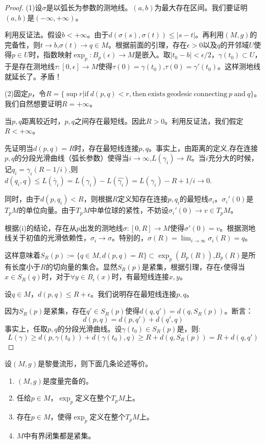     \begin{proof}
        (1)设$\sigma$是以弧长为参数的测地线。$(a,b)$为最大存在区间。我们要证明$(a,b)$是$(-\infty,+\infty)$。

        利用反证法。假设$b<+\infty$。由于$d(\sigma(s),\sigma(t))\leq |s-t|$。再利用$(M,g)$的完备性，则$t \to b$,$\sigma(t) \to q \in M$。根据前面的引理，存在$\epsilon>0$以及$q$的开邻域$U$使得$ p\in U$时，指数映射$\exp_p:B_p(\epsilon)\to M$是嵌入。取$|t_0 -b|<\epsilon/2$，$\gamma(t_0)\subset U$，于是存在测地线$\tau:[0,\epsilon] \to M$使得$\tau(0)=\gamma(t_0)$,$\tau(0)=\gamma'(t_0)$。这样测地线就延长了。矛盾！

        (2)固定$p$，令$R=\{\sup r| \mathrm{if}\ d(p,q)<r, \mathrm{then\ exists\ geodesic\ connecting}\ p\ \mathrm{and}\ q\}$。我们自然想要证明$R=+\infty$。

        当$p,q$距离较近时，$p,q$之间存在最短线。因此$R>0$。利用反证法，我们假定$R<+\infty$。

        先证明当$d(p,q)=R$时，存在最短线连接$p,q$。事实上，由距离的定义,存在连接$p,q$的分段光滑曲线（弧长参数）使得当$i \to \infty$,$L(\gamma_i) \to R$。当$i$充分大的时候，记$q_i=\gamma_i(R-1/i)$,则$d(q_i,q)\leq L(\check{\gamma_i})=L(\gamma_i)-L(\hat{\gamma_i})=L(\gamma_i)-R+1/i \to 0$.

        同时，由于$d(p,q_i)<R$，则根据$R$定义知存在连接$p,q_i$的最短线$\sigma_i$。$\sigma_i'(0)$是$T_pM$的单位向量。由于$T_pM$中单位球的紧性，不妨设$\sigma_i'(0)\to v \in T_pM$。

        根据(i)的结论，存在从$p$出发的测地线$\sigma:[0,R] \to M$使得$\sigma'(0)=v$。根据测地线关于初值的光滑依赖性，$\sigma_i \to \sigma$。特别的，$\sigma(R)=\lim_{i \to \infty}\sigma_i(R)=q$。

        这样意味着$S_R(p):=\{q\in M,d(p,q)=R\}\subset \exp_p(B_p(R))$,$B_p(R)$是所有长度小于$R$的切向量的集合。显然$S_R(p)$是紧集，根据引理，存在$\epsilon$使得当$x \in S_R(q)$时，对于$\forall y \in B_{\epsilon}(x)$时，有最短线连接$x,y$。

        设$q \in M$，$d(p,q)\leq R+\epsilon$。我们说明存在最短线连接$p,q$。

        因为$S_R(p)$是紧集，存在$q' \in S_R(p)$使得$d(q,q')=d(q,S_R(p))$。断言：
        $$
        d(p,q)=d(p,q')+d(q',q)
        $$
        事实上，任取$p,q$的分段光滑曲线。设$\gamma(t_0) \in S_R(p)$是，则:
        $$
        L(\gamma)\geq d(p,\gamma(t_0))+d(\gamma(t_0),q)\geq R+d(q,S_R(p))=R+d(q,q')
        $$
    \end{proof}
    \begin{theorem}
        设$(M,g)$是黎曼流形，则下面几条论述等价。
        \begin{enumerate}
            \item $(M,g)$是度量完备的。
            \item 任给$p \in M$，$\exp_p$定义在整个$T_pM$上。
            \item 存在$p \in M$，使得$\exp_p$定义在整个$T_pM$上。
            \item $M$中有界闭集都是紧集。
        \end{enumerate}
    \end{theorem}

